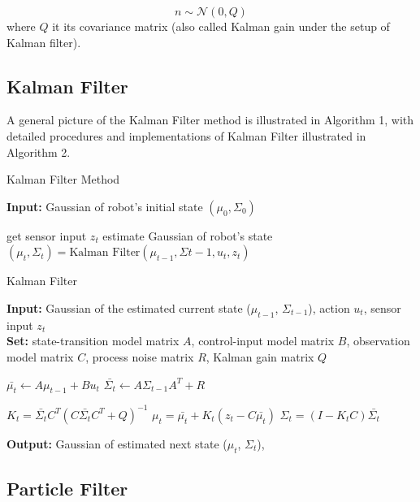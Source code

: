 \documentclass[conference,onecolumn]{IEEEtran}
\begin{document}
\begin{equation}
    n \sim \mathcal{N}\left(0, Q\right)
\end{equation}
where $Q$ it its covariance matrix (also called Kalman gain under the setup of Kalman filter).




\subsection{Kalman Filter}


A general picture of the Kalman Filter method is illustrated in Algorithm 1, with detailed procedures and implementations of Kalman Filter illustrated in Algorithm 2.

\begin{algorithm}[H]
\caption{Kalman Filter Method}\label{alg:kfm}
\textbf{Input:} Gaussian of robot's initial state $(\mu_0,\Sigma_0)$
\begin{algorithmic}
        \State get sensor input $z_t$
        \State estimate Gaussian of robot's state $(\mu_t,\Sigma_t) = \text{Kalman Filter}(\mu_{t-1},\Sigma{t-1}, u_t, z_t)$ 
        \EndWhile
\end{algorithmic}
\end{algorithm}

\begin{algorithm}[H]
\caption{Kalman Filter}\label{alg:kf}
\textbf{Input:} Gaussian of the estimated current state ($\mu_{t-1}$, $\Sigma_{t-1}$), action $u_{t}$, sensor input $z_{t}$\\
\textbf{Set:} state-transition model matrix $A$, control-input model matrix $B$,  observation model matrix $C$, process noise matrix $R$, Kalman gain matrix $Q$
\begin{algorithmic}
      \State $\bar{\mu_t} \gets A \mu_{t-1} + B u_t$ 
      \State $\bar{\Sigma_t} \gets A \Sigma_{t-1} A^T + R$

      \State $K_t = \bar{\Sigma_t} C^T (C \bar{\Sigma_t} C^T + Q)^{-1}$ 
      \State $\mu_t = \bar{\mu_t} + K_t(z_t - C \bar{\mu_t})$
      \State $\Sigma_t = (I - K_t C)\bar{\Sigma_t}$
\end{algorithmic}
\textbf{Output:} Gaussian of estimated next state ($\mu_{t}$, $\Sigma_{t}$),
\end{algorithm}

\subsection{Particle Filter}
\end{document}
